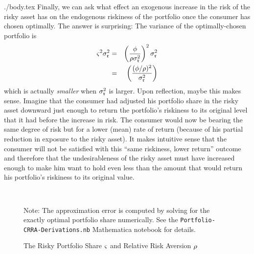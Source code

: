 \documentclass{bejournal}
\begin{document}
\begin{verbatimwrite}{./body.tex}
Finally, we can ask what effect an exogenous increase in the risk of the 
risky asset has on the endogenous riskiness of the portfolio once the consumer
has chosen optimally.  The answer is surprising: The variance of the optimally-chosen
portfolio is 
\begin{eqnarray}
{\varsigma}^{2} \sigma^{2}_{\mathfrak{r}} & = & \left(\frac{\phi}{\rho \sigma_{\mathfrak{r}}^{2}}\right)^{2} \sigma^{2}_{\mathfrak{r}}
\\ & = & \left(\frac{(\phi/\rho)^{2}}{\sigma_{\mathfrak{r}}^{2}}\right)
\end{eqnarray}
which is actually {\it smaller} when $\sigma^{2}_{\mathfrak{r}}$ is larger.
Upon reflection, maybe this makes sense.  Imagine that the consumer
had adjusted his portfolio share in the risky asset downward just
enough to return the portfolio's riskiness to its original level that
it had before the increase in risk.  The consumer would now be bearing
the same degree of risk but for a lower (mean) rate of return (because
of his partial reduction in exposure to the risky asset).  It makes
intuitive sense that the consumer will not be satisfied with this
``same riskiness, lower return'' outcome and therefore that the
undesirableness of the risky asset must have increased enough to make
him want to hold even less than the amount that would return his
portfolio's riskiness to its original value.


\begin{figure}[h]
\caption{The Risky Portfolio Share ${\varsigma}$ and Relative Risk Aversion $\rho$} \label{fig:Port}\centering
{}\\
\vspace{.1in}  \begin{flushleft} \footnotesize Note: The approximation error is computed by solving for the exactly optimal
portfolio share numerically.  See the \texttt{Portfolio-CRRA-Derivations.nb} Mathematica notebook for details.
\end{flushleft}
\end{figure}

\end{verbatimwrite}




\end{document}
